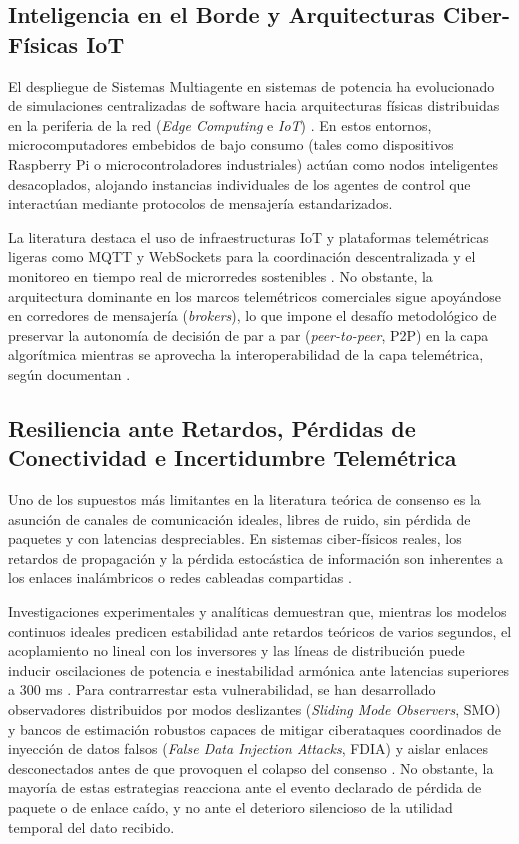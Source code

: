 \subsection{Inteligencia en el Borde y Arquitecturas Ciber-Físicas IoT}
El despliegue de Sistemas Multiagente en sistemas de potencia ha evolucionado de simulaciones centralizadas de software hacia arquitecturas físicas distribuidas en la periferia de la red (\textit{Edge Computing} e \textit{IoT}) \citep{Diaz2025, AlvarezLopez2026, Mehmood2021}. En estos entornos, microcomputadores embebidos de bajo consumo (tales como dispositivos Raspberry Pi o microcontroladores industriales) actúan como nodos inteligentes desacoplados, alojando instancias individuales de los agentes de control que interactúan mediante protocolos de mensajería estandarizados.

La literatura destaca el uso de infraestructuras IoT y plataformas telemétricas ligeras como MQTT y WebSockets para la coordinación descentralizada y el monitoreo en tiempo real de microrredes sostenibles \citep{Diaz2025}. No obstante, la arquitectura dominante en los marcos telemétricos comerciales sigue apoyándose en corredores de mensajería (\textit{brokers}), lo que impone el desafío metodológico de preservar la autonomía de decisión de par a par (\textit{peer-to-peer}, P2P) en la capa algorítmica mientras se aprovecha la interoperabilidad de la capa telemétrica, según documentan \citep{Diaz2025, Mamun2026}.

\subsection{Resiliencia ante Retardos, Pérdidas de Conectividad e Incertidumbre Telemétrica}
Uno de los supuestos más limitantes en la literatura teórica de consenso es la asunción de canales de comunicación ideales, libres de ruido, sin pérdida de paquetes y con latencias despreciables. En sistemas ciber-físicos reales, los retardos de propagación y la pérdida estocástica de información son inherentes a los enlaces inalámbricos o redes cableadas compartidas \citep{Olayanju2025ConsensusFreq}.

Investigaciones experimentales y analíticas demuestran que, mientras los modelos continuos ideales predicen estabilidad ante retardos teóricos de varios segundos, el acoplamiento no lineal con los inversores y las líneas de distribución puede inducir oscilaciones de potencia e inestabilidad armónica ante latencias superiores a 300 ms \citep{Olayanju2025ConsensusFreq}. Para contrarrestar esta vulnerabilidad, se han desarrollado observadores distribuidos por modos deslizantes (\textit{Sliding Mode Observers}, SMO) y bancos de estimación robustos capaces de mitigar ciberataques coordinados de inyección de datos falsos (\textit{False Data Injection Attacks}, FDIA) y aislar enlaces desconectados antes de que provoquen el colapso del consenso \citep{Barzegari2022Resilient, TaverasCruz2025, Fathima2024}. No obstante, la mayoría de estas estrategias reacciona ante el evento declarado de pérdida de paquete o de enlace caído, y no ante el deterioro silencioso de la utilidad temporal del dato recibido.

